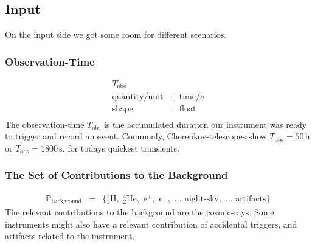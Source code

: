 \documentclass{article}%
\begin{document}
        \subsection{Input}
            On the input side we got some room for different scenarios.
        \subsubsection*{Observation-Time}
            \begin{eqnarray*}
                T_\text{obs} && \\
                \text{quantity}/\text{unit} &:& \text{time} / s\\
                \text{shape} &:& \text{float}\\
            \end{eqnarray*}
            The observation-time $T_\text{obs}$ is the accumulated duration our instrument was ready to trigger and record an event.
            Commonly, Cherenkov-telescopes show $T_\text{obs} = 50\,$h or $T_\text{obs} = 1800\,$s. for todays quickest transients.
        \subsubsection*{The Set of Contributions to the Background}
            \begin{eqnarray*}
                \mathbb{P}_\text{background} &=& \{
                {_1^1}\text{H},\,\,
                {_2^4}\text{He},\,\,
                \text{e}^{+},\,\,
                \text{e}^{-},\,\,
                \dots{}\,\,
                \text{night-sky},\,\,
                \dots{}\,\,
                \text{artifacts}
                \}
            \end{eqnarray*}
            The relevant contributions to the background are the cosmic-rays. Some instruments might also have a relevant contribution of accidental triggers, and artifacts related to the instrument.
\end{document}
